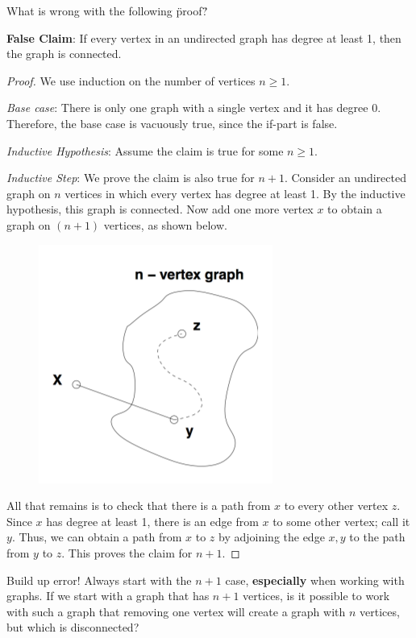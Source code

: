 \question What is wrong with the following \"proof\"? \newline

\textbf{False Claim}: If every vertex in an undirected graph has degree 
at least 1, then the graph is connected.\newline

\begin{proof} We use induction on the number of vertices $n \geq 1$.\newline

\textit{Base case}: There is only one graph with a single vertex and it 
has degree 0. Therefore, the base case is vacuously true, since the 
if-part is false.\newline

\textit{Inductive Hypothesis}: Assume the claim is true for some $n 
\geq 1$.\newline

\textit{Inductive Step}: We prove the claim is also true for $n + 1$. 
Consider an undirected graph on $n$ vertices in which every vertex has 
degree at least 1. By the inductive hypothesis, this graph is connected. 
Now add one more vertex $x$ to obtain a graph on $(n + 1)$ vertices, 
as shown below.

\begin{figure}[h]
\includegraphics{build_up_error}
\centering
\end{figure}
 
All that remains is to check that there is a path from $x$ to every 
other vertex $z$. Since $x$ has degree at least 1, there is an edge 
from $x$ to some other vertex; call it $y$. Thus, we can obtain a 
path from $x$ to $z$ by adjoining the edge ${x, y}$ to the path from 
$y$ to $z$. This proves the claim for $n + 1$.
\end{proof}

\begin{solution}
Build up error! Always start with the $n+1$ case, \textbf{especially} 
when working with graphs. If we start with a graph that has $n+1$ 
vertices, is it possible to work with such a graph that removing one 
vertex will create a graph with $n$ vertices, but which is disconnected?
\end{solution}

\clearpage